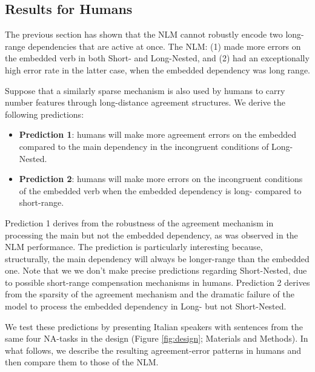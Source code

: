 \subsection{Results for Humans}
The previous section has shown that the NLM cannot robustly encode two long-range dependencies that are active at once. The NLM: (1) made more errors on the embedded verb in both Short- and Long-Nested, and (2) had an exceptionally high error rate in the latter case, when the embedded dependency was long range.

Suppose that a similarly sparse mechanism is also used by humans to carry number features through long-distance agreement structures. We derive the following predictions:

\begin{itemize}
    \item \textbf{Prediction 1}: humans will make more agreement errors on the embedded compared to the main dependency in the incongruent conditions of Long-Nested. 
    \item \textbf{Prediction 2}: humans will make more errors on the incongruent conditions of the embedded verb when the embedded dependency is long- compared to short-range.
\end{itemize}

Prediction 1 derives from the robustness of the agreement mechanism in processing the main but not the embedded dependency, as was observed in the NLM performance. The prediction is particularly interesting because, structurally, the main dependency will always be longer-range than the embedded one. Note that we we don't make precise predictions regarding Short-Nested, due to possible short-range compensation mechanisms in humans. Prediction 2 derives from the sparsity of the agreement mechanism and the dramatic failure of the model to process the embedded dependency in Long- but not Short-Nested. 

We test these predictions by presenting Italian speakers with sentences from the same four NA-tasks in the design (Figure \ref{fig:design}; Materials and Methods). In what follows, we describe the resulting agreement-error patterns in humans and then compare them to those of the NLM.

